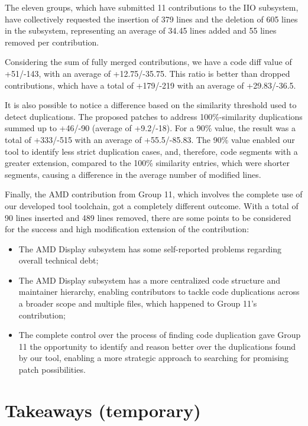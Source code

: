 \documentclass[10pt,conference]{IEEEtran}
\begin{document}
The eleven groups, which have submitted 11 contributions to the IIO subsystem, have collectively requested the insertion of 379 lines and the deletion of 605 lines in the subsystem, representing an average of 34.45 lines added and 55 lines removed per contribution.

Considering the sum of fully merged contributions, we have a code diff value of +51/-143, with an average of +12.75/-35.75. This ratio is better than dropped contributions, which have a total of +179/-219 with an average of +29.83/-36.5.

It is also possible to notice a difference based on the similarity threshold used to detect duplications. The proposed patches to address 100\%-similarity duplications summed up to +46/-90 (average of +9.2/-18). For a 90\% value, the result was a total of +333/-515 with an average of +55.5/-85.83. The 90\% value enabled our tool to identify less strict duplication cases, and, therefore, code segments with a greater extension, compared to the 100\% similarity entries, which were shorter segments, causing a difference in the average number of modified lines.

Finally, the AMD contribution from Group 11, which involves the complete use of our developed tool toolchain, got a completely different outcome. With a total of 90 lines inserted and 489 lines removed, there are some points to be considered for the success and high modification extension of the contribution:

\begin{itemize}
    \item The AMD Display subsystem has some self-reported problems regarding overall technical debt;
    \item The AMD Display subsystem has a more centralized code structure and maintainer hierarchy, enabling contributors to tackle code duplications across a broader scope and multiple files, which happened to Group 11's contribution;
    \item The complete control over the process of finding code duplication gave Group 11 the opportunity to identify and reason better over the duplications found by our tool, enabling a more strategic approach to searching for promising patch possibilities. 
\end{itemize}

\section{Takeaways (temporary)}
\end{document}

